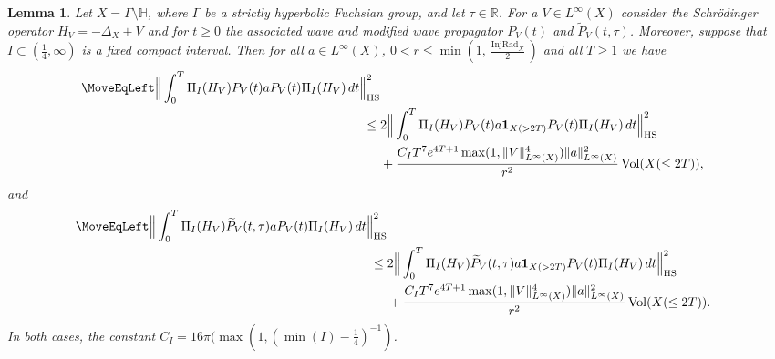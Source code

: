 \documentclass[11pt,twoside,reqno]{amsart}
\newcommand{\R}{\mathbb{R}}
\newcommand{\bH}{\mathbb{H}}
\newcommand{\1}{\mathrm{\mathbf{1}}}
\newcommand{\bHS}{\mathrm{HS}}
\DeclareMathOperator{\Vol}{Vol}
\DeclareMathOperator{\InjRad}{InjRad}
\numberwithin{equation}{section}
\theoremstyle{plain}
\newtheorem{lemma}[thm]{Lemma}
\theoremstyle{definition}
\theoremstyle{remark}
\begin{document}
\begin{lemma}\label{LE:lifting_type_lemma}
    Let $X=\Gamma\setminus \bH$, where $\Gamma$ be a strictly hyperbolic Fuchsian group, and let $\tau\in\R$. For a $V\in L^\infty(X)$ consider the Schr\"odinger operator $H_V = -\Delta_X + V$ and for $t\geq 0$ the associated wave and modified wave propagator $P_V(t)$ and $\widetilde{P}_V(t,\tau)$. Moreover, suppose that $I\subset (\frac{1}{4},\infty)$ is a fixed compact interval. Then for all $a\in L^\infty(X)$, $0<r\leq \min(1, \frac{\InjRad_X}{2})$ and all $T\geq1$ we have
    \begin{equation*}
    \begin{aligned}
       \MoveEqLeft \Big\lVert \int_0^T \Pi_I(H_V) P_V(t) a P_V(t) \Pi_I(H_V) \, d t \Big\rVert_{\bHS}^2 
       \\
       \leq{}& 2\Big\lVert \int_0^T \Pi_I(H_V) P_V(t) a \boldsymbol{1}_{X(>2T)} P_V(t) \Pi_I(H_V) \, d t  \Big\rVert_{\bHS}^2 
        \\
        &+ \frac{C_I T^7 e^{4T+1}\max(1, \lVert V\rVert_{L^\infty(X)}^4) \lVert a \rVert^2_{L^\infty(X)}}{r^2} \Vol(X(\leq2T)), 
        \end{aligned}
    \end{equation*}
    and 
    \begin{equation*}
    \begin{aligned}
       \MoveEqLeft \Big\lVert \int_0^T \Pi_I(H_V) \widetilde{P}_V(t,\tau) a P_V(t) \Pi_I(H_V) \, d t \Big\rVert_{\bHS}^2 
       \\
       \leq{}& 2\Big\lVert \int_0^T \Pi_I(H_V) \widetilde{P}_V(t,\tau) a \boldsymbol{1}_{X(>2T)} P_V(t) \Pi_I(H_V) \, d t  \Big\rVert_{\bHS}^2 
        \\
        &+ \frac{C_I T^7 e^{4T+1}\max(1, \lVert V\rVert_{L^\infty(X)}^4) \lVert a \rVert^2_{L^\infty(X)}}{r^2} \Vol(X(\leq2T)). 
        \end{aligned}
    \end{equation*}
    In both cases, the constant $C_I = 16 \pi (\max(1,(\min(I)-\frac14)^{-1})$.
\end{lemma}
\end{document}

